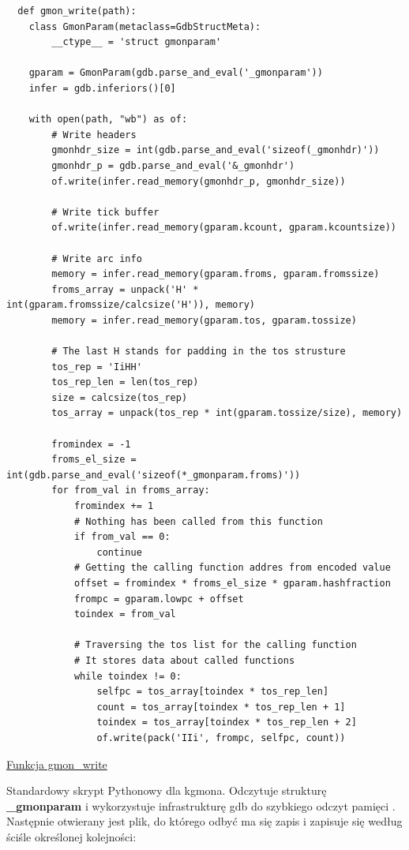 \documentclass[shortabstract]{iithesis}
\theoremstyle{definition} \newtheorem*{definition}{Definicja}
\theoremstyle{definition} \newtheorem*{example}{Przykład}
\theoremstyle{definition} \newtheorem*{remark}{Uwaga}
\newenvironment{longlisting}{\captionsetup{type=listing}}{}
\begin{document}
\begin{longlisting}
  \begin{verbatim}
  def gmon_write(path):
    class GmonParam(metaclass=GdbStructMeta):
        __ctype__ = 'struct gmonparam'

    gparam = GmonParam(gdb.parse_and_eval('_gmonparam'))
    infer = gdb.inferiors()[0]

    with open(path, "wb") as of:
        # Write headers
        gmonhdr_size = int(gdb.parse_and_eval('sizeof(_gmonhdr)'))
        gmonhdr_p = gdb.parse_and_eval('&_gmonhdr')
        of.write(infer.read_memory(gmonhdr_p, gmonhdr_size))

        # Write tick buffer
        of.write(infer.read_memory(gparam.kcount, gparam.kcountsize))

        # Write arc info
        memory = infer.read_memory(gparam.froms, gparam.fromssize)
        froms_array = unpack('H' * int(gparam.fromssize/calcsize('H')), memory)
        memory = infer.read_memory(gparam.tos, gparam.tossize)

        # The last H stands for padding in the tos strusture
        tos_rep = 'IiHH'
        tos_rep_len = len(tos_rep)
        size = calcsize(tos_rep)
        tos_array = unpack(tos_rep * int(gparam.tossize/size), memory)

        fromindex = -1
        froms_el_size = int(gdb.parse_and_eval('sizeof(*_gmonparam.froms)'))
        for from_val in froms_array:
            fromindex += 1
            # Nothing has been called from this function
            if from_val == 0:
                continue
            # Getting the calling function addres from encoded value
            offset = fromindex * froms_el_size * gparam.hashfraction
            frompc = gparam.lowpc + offset
            toindex = from_val

            # Traversing the tos list for the calling function
            # It stores data about called functions
            while toindex != 0:
                selfpc = tos_array[toindex * tos_rep_len]
                count = tos_array[toindex * tos_rep_len + 1]
                toindex = tos_array[toindex * tos_rep_len + 2]
                of.write(pack('IIi', frompc, selfpc, count))
  \end{verbatim}
  \caption{\href{https://mimiker.ii.uni.wroc.pl/source/xref/mimiker/sys/debug/kgmon.py?r=624198e4\#8}{Funkcja gmon\_write}}
  \label{lst:funcgmonwrite}
\end{longlisting}

Standardowy skrypt Pythonowy dla kgmona. Odczytuje strukturę \textbf{\_gmonparam} i wykorzystuje infrastrukturę gdb do szybkiego odczyt pamięci \cite{bib:inferior}. Następnie otwierany jest plik, do którego odbyć ma się zapis i zapisuje się według ściśle określonej kolejności:
\end{document}
